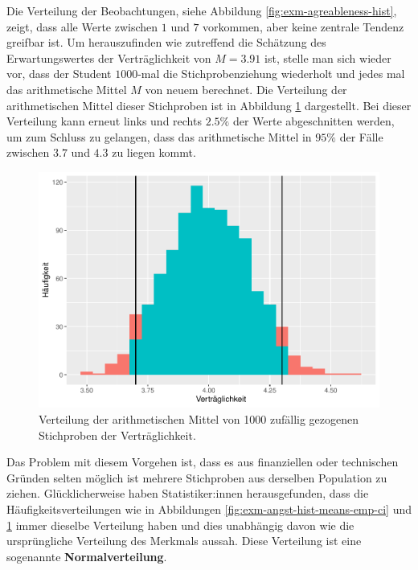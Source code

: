 \documentclass[
]{book}
\theoremstyle{definition}
\theoremstyle{definition}
\theoremstyle{definition}
\theoremstyle{definition}
\theoremstyle{remark}
\begin{document}
Die Verteilung der Beobachtungen, siehe Abbildung \ref{fig:exm-agreableness-hist}, zeigt, dass alle Werte zwischen \(1\) und \(7\) vorkommen, aber keine zentrale Tendenz greifbar ist. Um herauszufinden wie zutreffend die Schätzung des Erwartungswertes der Verträglichkeit von \(M=3.91\) ist, stelle man sich wieder vor, dass der Student \(1000\)-mal die Stichprobenziehung wiederholt und jedes mal das arithmetische Mittel \(M\) von neuem berechnet. Die Verteilung der arithmetischen Mittel dieser Stichproben ist in Abbildung \ref{fig:exm-agreableness-hist-means} dargestellt. Bei dieser Verteilung kann erneut links und rechts \(2.5\%\) der Werte abgeschnitten werden, um zum Schluss zu gelangen, dass das arithmetische Mittel in \(95\%\) der Fälle zwischen \(3.7\) und \(4.3\) zu liegen kommt.

\begin{figure}
\centering
\includegraphics{aps_statistik1_files/figure-latex/exm-agreableness-hist-means-1.pdf}
\caption{\label{fig:exm-agreableness-hist-means}Verteilung der arithmetischen Mittel von 1000 zufällig gezogenen Stichproben der Verträglichkeit.}
\end{figure}

Das Problem mit diesem Vorgehen ist, dass es aus finanziellen oder technischen Gründen selten möglich ist mehrere Stichproben aus derselben Population zu ziehen. Glücklicherweise haben Statistiker:innen herausgefunden, dass die Häufigkeitsverteilungen wie in Abbildungen \ref{fig:exm-angst-hist-means-emp-ci} und \ref{fig:exm-agreableness-hist-means} immer dieselbe Verteilung haben und dies unabhängig davon wie die ursprüngliche Verteilung des Merkmals aussah. \label{customdef-normalverteilung}{Diese Verteilung ist eine sogenannte \textbf{Normalverteilung}}.
\end{document}
